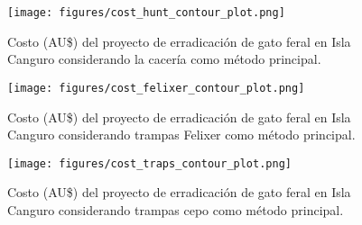 \documentclass{article} %
\begin{document}
\begin{figure}[H]
\centering
\texttt{[image: figures/cost\_hunt\_contour\_plot.png]}
\caption{Costo (AU\$) del proyecto de erradicación de gato feral en Isla Canguro considerando la
cacería como método principal.}
\label{fig:cost_hunting_contour_plot}
\end{figure}

\begin{figure}[H]
\centering
\texttt{[image: figures/cost\_felixer\_contour\_plot.png]}
\caption{Costo (AU\$) del proyecto de erradicación de gato feral en Isla Canguro considerando
trampas Felixer como método principal.}
\label{fig:cost_felixer_plot}
\end{figure}

\begin{figure}[H]
\centering
\texttt{[image: figures/cost\_traps\_contour\_plot.png]}
\caption{Costo (AU\$) del proyecto de erradicación de gato feral en Isla Canguro considerando
trampas cepo como método principal.}
\label{fig:cost_tramps_contour_plot}
\end{figure}



\end{document}
